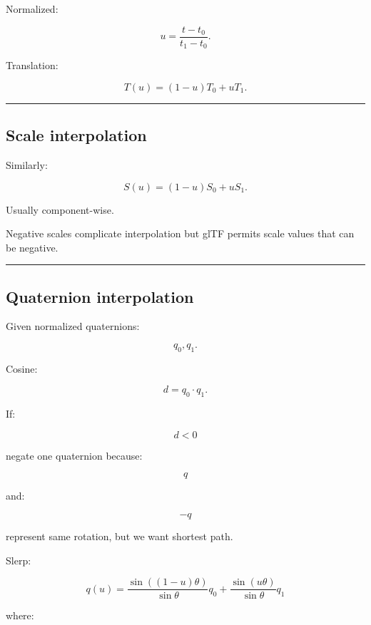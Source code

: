Normalized:

\[
u=
\frac{t-t_0}{t_1-t_0}.
\]

Translation:

\[
\boxed{
T(u)
=
(1-u)T_0+uT_1.
}
\]

\begin{center}\rule{0.5\linewidth}{0.5pt}\end{center}

\subsection{Scale interpolation}\label{04-visual-computing-ii-ch041-scale-interpolation}

\hypertarget{04-visual-computing-ii-ch041-scale-interpolation}{}

Similarly:

\[
\boxed{
S(u)
=
(1-u)S_0+uS_1.
}
\]

Usually component-wise.

Negative scales complicate interpolation but glTF permits scale values that can be negative.

\begin{center}\rule{0.5\linewidth}{0.5pt}\end{center}

\subsection{Quaternion interpolation}\label{04-visual-computing-ii-ch041-quaternion-interpolation}

\hypertarget{04-visual-computing-ii-ch041-quaternion-interpolation}{}

Given normalized quaternions:

\[
q_0,q_1.
\]

Cosine:

\[
d=q_0\cdot q_1.
\]

If:

\[
d<0
\]

negate one quaternion because:

\[
q
\]

and:

\[
-q
\]

represent same rotation, but we want shortest path.

Slerp:

\[
\boxed{
q(u)
=
\frac{
\sin((1-u)\theta)
}{
\sin\theta
}
q_0
+
\frac{
\sin(u\theta)
}{
\sin\theta
}
q_1
}
\]

where:

